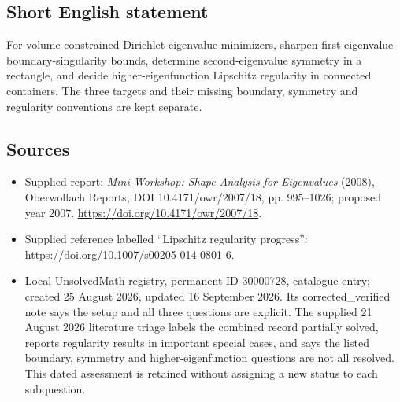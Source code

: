 \documentclass[11pt]{article}
\begin{document}
\subsection{Short English statement}
For volume-constrained Dirichlet-eigenvalue minimizers, sharpen first-eigenvalue boundary-singularity bounds, determine second-eigenvalue symmetry in a rectangle, and decide higher-eigenfunction Lipschitz regularity in connected containers. The three targets and their missing boundary, symmetry and regularity conventions are kept separate.
\subsection{Sources}
\begin{itemize}
\item Supplied report: \emph{Mini-Workshop: Shape Analysis for Eigenvalues} (2008), Oberwolfach Reports, DOI 10.4171/owr/2007/18, pp. 995--1026; proposed year 2007. \url{https://doi.org/10.4171/owr/2007/18}.
\item Supplied reference labelled ``Lipschitz regularity progress'': \url{https://doi.org/10.1007/s00205-014-0801-6}.
\item Local UnsolvedMath registry, permanent ID 30000728, catalogue entry; created 25 August 2026, updated 16 September 2026. Its corrected\_verified note says the setup and all three questions are explicit. The supplied 21 August 2026 literature triage labels the combined record partially solved, reports regularity results in important special cases, and says the listed boundary, symmetry and higher-eigenfunction questions are not all resolved. This dated assessment is retained without assigning a new status to each subquestion.
\end{itemize}
\end{document}
